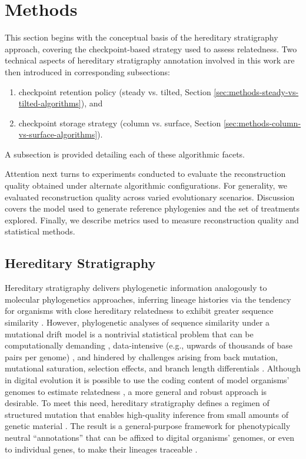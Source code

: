 \section{Methods} \label{sec:methods}

This section begins with the conceptual basis of the hereditary stratigraphy approach, covering the checkpoint-based strategy used to assess relatedness.
Two technical aspects of hereditary stratigraphy annotation involved in this work are then introduced in corresponding subsections:
\begin{enumerate}
\item checkpoint retention policy (steady vs. tilted, Section \ref{sec:methods-steady-vs-tilted-algorithms}), and
\item checkpoint storage strategy (column vs. surface, Section \ref{sec:methods-column-vs-surface-algorithms}).
\end{enumerate}
A subsection is provided detailing each of these algorithmic facets.

Attention next turns to experiments conducted to evaluate the reconstruction quality obtained under alternate algorithmic configurations.
For generality, we evaluated reconstruction quality across varied evolutionary scenarios.
Discussion covers the model used to generate reference phylogenies and the set of treatments explored.
Finally, we describe metrics used to measure reconstruction quality and statistical methods.

\subsection{Hereditary Stratigraphy}

Hereditary stratigraphy delivers phylogenetic information analogously to molecular phylogenetics approaches, inferring lineage histories via the tendency for organisms with close hereditary relatedness to exhibit greater sequence similarity \citep{yang2012molecular}.
However, phylogenetic analyses of sequence similarity under a mutational drift model is a nontrivial statistical problem \citep{neyman1971molecular} that can be computationally demanding \citep{konno2022deep,stamatakis2013novel}, data-intensive (e.g., upwards of thousands of base pairs per genome) \citep{parks2009increasing,cloutier2019whole,wortley2005much}, and hindered by challenges arising from back mutation, mutational saturation, selection effects, and branch length differentials \citep{brocchieri2001phylogenetic,moreira2000molecular}.
Although in digital evolution it is possible to use the coding content of model organisms' genomes to estimate relatedness \citep{moreno2021case}, a more general and robust approach is desirable.
To meet this need, hereditary stratigraphy defines a regimen of structured mutation that enables high-quality inference from small amounts of genetic material \citep{moreno2022hereditary}.
The result is a general-purpose framework for phenotypically neutral ``annotations'' that can be affixed to digital organisms' genomes, or even to individual genes, to make their lineages traceable \citep{moreno2022hstrat}.

